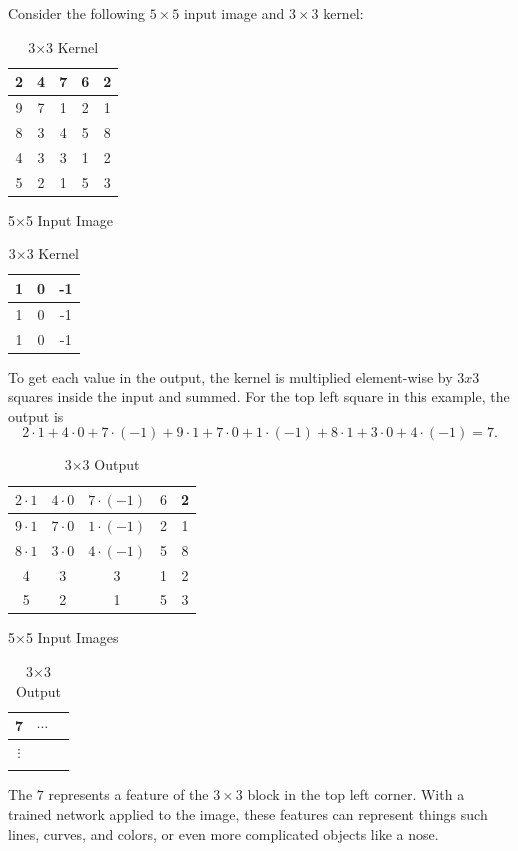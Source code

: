 Consider the following $5\times 5$ input image and $3\times 3$ kernel:
\begin{table}[H]
\parbox{.45\linewidth}{
\centering
\begin{tabular}{|c|c|c|c|c|}
\hline
2 & 4 & 7 & 6 & 2\\
\hline
9 & 7 & 1 & 2 & 1\\
\hline
8 & 3 & 4 & 5 & 8\\
\hline
4 & 3 & 3 & 1 & 2\\
\hline
5 & 2 & 1 & 5 & 3\\
\hline
\end{tabular}
\label{tab:input}
\caption*{5$\times$5 Input Image}
}
\hfill
\parbox{.45\linewidth}{
\centering
\begin{tabular}{|c|c|c|}
\hline
1 & 0 & -1\\
\hline
1 & 0 & -1\\
\hline
1 & 0 & -1\\
\hline
\end{tabular}
\label{tab:input}
\caption*{3$\times$3 Kernel}
}
\end{table}

\noindent
To get each value in the output, the kernel is multiplied element-wise by $3x3$ squares inside the input and summed.
For the top left square in this example, the output is
\[
2\cdot 1 + 4\cdot 0 + 7\cdot (-1) + 9\cdot 1 + 7\cdot 0 + 1\cdot (-1) + 8\cdot 1 + 3\cdot 0 + 4\cdot (-1) = 7.
\]
\begin{table}[H]
\parbox{.45\linewidth}{
\centering
\begin{tabular}{|c|c|c|c|c|}
\hline
$2\cdot 1$ & $4\cdot 0$ & $7\cdot (-1)$ & $6$ & 2\\
\hline
$9\cdot 1$ & $7\cdot0$ & $1\cdot (-1)$ & 2 & 1\\
\hline
$8\cdot 1$ & $3\cdot0$ & $4\cdot (-1)$ & 5 & 8\\
\hline
4 & 3 & 3 & 1 & 2\\
\hline
5 & 2 & 1 & 5 & 3\\
\hline
\end{tabular}
\label{tab:input}
\caption*{5$\times$5 Input Images}
}
\hfill
\parbox{.45\linewidth}{
\centering
\begin{tabular}{|c|c|c|}
\hline
7 & \(\cdots\) & \\
\hline
\(\vdots\) &  & \\
\hline
 & & \\
\hline
\end{tabular}
\label{tab:input}
\caption*{3$\times $3 Output}
}
\end{table}
\noindent
The $7$ represents a feature of the $3\times 3$ block in the top left corner.
With a trained network applied to the image, these features can represent things such lines, curves, and colors, or even more complicated objects like a nose.

